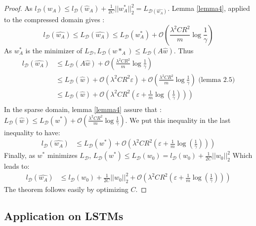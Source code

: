 \documentclass{article}
\begin{document}
\begin{proof} As 
$l_{\mathcal{D}}(\hat{w}_A) \leq l_{\mathcal{D}}(\hat{w}_A) 
+ \frac{1}{2C} ||w^*_A||_2^2 = L_{\mathcal{D}(\hat{w_A})}$.
Lemma \ref{lemma4}, applied to the compressed domain gives :
\[ l_\mathcal{D}(\hat{w_A}) \leq
    L_\mathcal{D}(\hat{w_A}) 
    \leq L_\mathcal{D}(w_A^*) 
    + \mathcal{O}\left (\frac{\lambda^2 C R^2}{m}\log \frac{1}{\gamma} \right )
\]
As $w^*_A$ is the minimizer of
 $L_{\mathcal{D}}, L_{\mathcal{D}}(w*_A) \leq L_{\mathcal{D}}(A\hat{w}) $.
Thus 
\begin{align*}
    l_\mathcal{D}(\hat{w_A}) 
    &\leq L_\mathcal{D}(A\hat{w}) 
    + \mathcal{O}\left (\frac{\lambda^2 C R^2}{m}\log \frac{1}{\gamma} \right ) \\
    &\leq L_\mathcal{D}(\hat{w}) + \mathcal{O}(\lambda^2 C R^2 \varepsilon)
    + \mathcal{O}\left (\frac{\lambda^2 C R^2}{m}\log \frac{1}{\gamma} \right ) 
    \text{    (lemma 2.5)}\\
    &\leq L_\mathcal{D}(\hat{w}) 
    + \mathcal{O}\left ( 
        \lambda^2CR^2 \left (
        \varepsilon + \frac{1}{m} \log(\frac{1}{\gamma})
        \right ) \right ) \\
\end{align*}
In the sparse domain, lemma \ref{lemma4} assure that : 
$L_{\mathcal{D}}(\hat{w}) \leq L_{\mathcal{D}}(w^*) + \mathcal{O}\left (\frac{\lambda^2 C R^2}{m}\log \frac{1}{\gamma} \right )
$.
We put this inequality in the last inequality to have:
\begin{align*}
    l_\mathcal{D}(\hat{w_A})    
    &\leq L_\mathcal{D}(w^*) 
    + \mathcal{O}\left ( 
        \lambda^2CR^2 \left (
        \varepsilon + \frac{1}{m} \log(\frac{1}{\gamma})
        \right ) \right )
\end{align*}
Finally, as $w^*$ minimizes $L_{\mathcal{D}}$, 
$L_{\mathcal{D}}(w^*) \leq L_{\mathcal{D}}(w_0) =
 l_{\mathcal{D}}(w_0) + \frac{1}{2C}||w_0||_2^2$
 Which leads to:
 \begin{align*}
    l_\mathcal{D}(\hat{w_A})    
    &\leq  l_{\mathcal{D}}(w_0) + \frac{1}{2C}||w_0||_2^2
    + \mathcal{O}\left ( 
        \lambda^2CR^2 \left (
        \varepsilon + \frac{1}{m} \log(\frac{1}{\gamma})
        \right ) \right )
 \end{align*}
 The theorem follows easily by optimizing $C$. 
\end{proof}


\subsection{Application on LSTMs}
\end{document}

